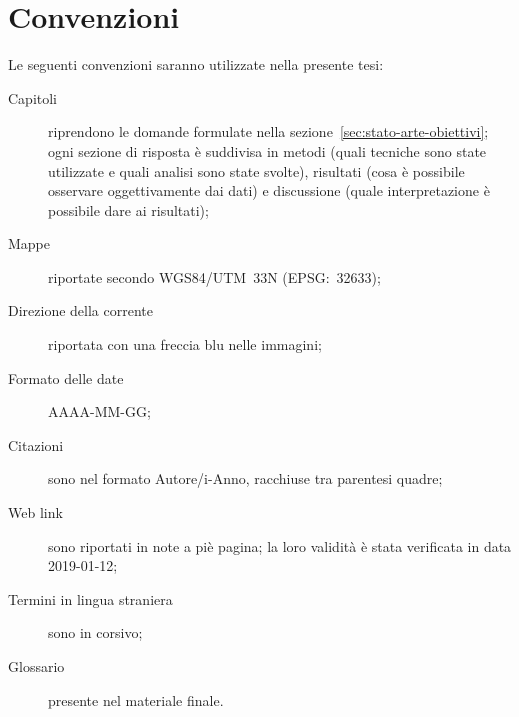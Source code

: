 \section{Convenzioni}
Le seguenti convenzioni saranno utilizzate nella presente tesi:
\begin{description}
	\item[Capitoli] riprendono le domande formulate nella sezione~\ref{sec:stato-arte-obiettivi}; ogni sezione di risposta è suddivisa in metodi (quali tecniche sono state utilizzate e quali analisi sono state svolte), risultati (cosa è possibile osservare oggettivamente dai dati) e discussione (quale interpretazione è possibile dare ai risultati);
	\item[Mappe] riportate secondo WGS84/UTM~33N (EPSG:~32633);
	\item[Direzione della corrente] riportata con una freccia blu nelle immagini;
	\item[Formato delle date] AAAA-MM-GG;
	\item[Citazioni] sono nel formato Autore/i-Anno, racchiuse tra parentesi quadre;
	\item[Web link] sono riportati in note a piè pagina; la loro validità è stata verificata in data 2019-01-12;
	\item[Termini in lingua straniera] sono in corsivo;
	\item[Glossario] presente nel materiale finale.
\end{description}

